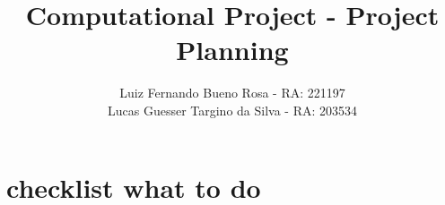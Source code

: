\documentclass{article}
\title{Computational Project - Project Planning}
\author{
	Luiz Fernando Bueno Rosa - RA: 221197 \\
	Lucas Guesser Targino da Silva - RA: 203534
}
\begin{document}
\maketitle

\section{checklist what to do}









\end{document}
